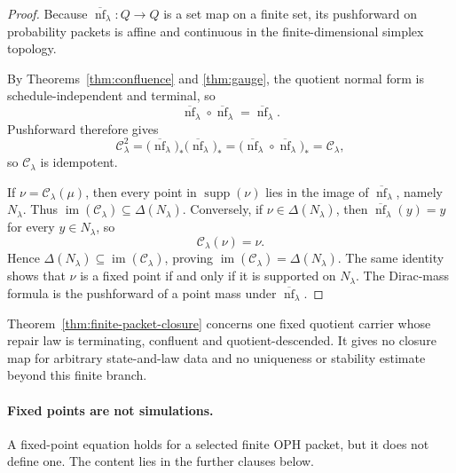 \documentclass[11pt]{article}
\theoremstyle{remark}
\theoremstyle{plain}
\begin{document}
\begin{proof}
Because \(\overline{\operatorname{nf}}_\lambda:Q\to Q\) is a set map on a finite set, its
pushforward on probability packets is affine and continuous in the finite-dimensional simplex
topology.

By Theorems~\ref{thm:confluence} and \ref{thm:gauge}, the quotient normal form is
schedule-independent and terminal, so
\[
\overline{\operatorname{nf}}_\lambda\circ\overline{\operatorname{nf}}_\lambda
=
\overline{\operatorname{nf}}_\lambda.
\]
Pushforward therefore gives
\[
\mathcal C_\lambda^2
=
\bigl(\overline{\operatorname{nf}}_\lambda\bigr)_*
\bigl(\overline{\operatorname{nf}}_\lambda\bigr)_*
=
\bigl(\overline{\operatorname{nf}}_\lambda\circ\overline{\operatorname{nf}}_\lambda\bigr)_*
=
\mathcal C_\lambda,
\]
so \(\mathcal C_\lambda\) is idempotent.

If \(\nu=\mathcal C_\lambda(\mu)\), then every point in \(\operatorname{supp}(\nu)\) lies in the
image of \(\overline{\operatorname{nf}}_\lambda\), namely \(N_\lambda\). Thus
\(\operatorname{im}(\mathcal C_\lambda)\subseteq \Delta(N_\lambda)\). Conversely, if
\(\nu\in\Delta(N_\lambda)\), then \(\overline{\operatorname{nf}}_\lambda(y)=y\) for every
\(y\in N_\lambda\), so
\[
\mathcal C_\lambda(\nu)=\nu.
\]
Hence \(\Delta(N_\lambda)\subseteq \operatorname{im}(\mathcal C_\lambda)\), proving
\(\operatorname{im}(\mathcal C_\lambda)=\Delta(N_\lambda)\). The same identity shows that
\(\nu\) is a fixed point if and only if it is supported on \(N_\lambda\). The Dirac-mass formula
is the pushforward of a point mass under \(\overline{\operatorname{nf}}_\lambda\).
\end{proof}

Theorem~\ref{thm:finite-packet-closure} concerns one fixed quotient carrier
whose repair law is terminating, confluent and quotient-descended. It gives
no closure map for arbitrary state-and-law data and no uniqueness or
stability estimate beyond this finite branch.

\paragraph{Fixed points are not simulations.}
A fixed-point equation holds for a selected finite OPH packet, but it does
not define one. The content lies in the further clauses below.
\end{document}
